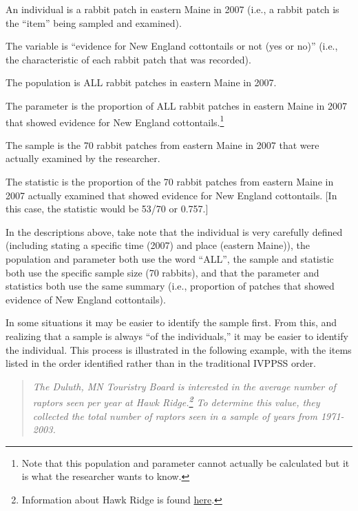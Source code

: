 \documentclass[10pt,openany]{book}\usepackage[]{graphicx}\usepackage[]{color}
\begin{document}
\begin{Itemize}
  \item An individual is a rabbit patch in eastern Maine in 2007 (i.e., a rabbit patch is the ``item'' being sampled and examined).
  \item The variable is ``evidence for New England cottontails or not (yes or no)'' (i.e., the characteristic of each rabbit patch that was recorded).
  \item The population is ALL rabbit patches in eastern Maine in 2007.
  \item The parameter is the proportion of ALL rabbit patches in eastern Maine in 2007 that showed evidence for New England cottontails.\footnote{Note that this population and parameter cannot actually be calculated but it is what the researcher wants to know.}
  \item The sample is the 70 rabbit patches from eastern Maine in 2007 that were actually examined by the researcher.
  \item The statistic is the proportion of the 70 rabbit patches from eastern Maine in 2007 actually examined that showed evidence for New England cottontails. [In this case, the statistic would be 53/70 or 0.757.]
\end{Itemize}

In the descriptions above, take note that the individual is very carefully defined (including stating a specific time (2007) and place (eastern Maine)), the population and parameter both use the word ``ALL'', the sample and statistic both use the specific sample size (70 rabbits), and that the parameter and statistics both use the same summary (i.e., proportion of patches that showed evidence of New England cottontails).

In some situations it may be easier to identify the sample first. From this, and realizing that a sample is always ``of the individuals,'' it may be easier to identify the individual. This process is illustrated in the following example, with the items listed in the order identified rather than in the traditional IVPPSS order.

\vspace{-6pt}
\begin{quote}
\textit{The Duluth, MN Touristry Board is interested in the average number of raptors seen per year at Hawk Ridge.\footnote{Information about Hawk Ridge is found \href{http://www.hawkridge.org/}{here}.}  To determine this value, they collected the total number of raptors seen in a sample of years from 1971-2003.}
\end{quote}
\vspace{-6pt}
\end{document}
